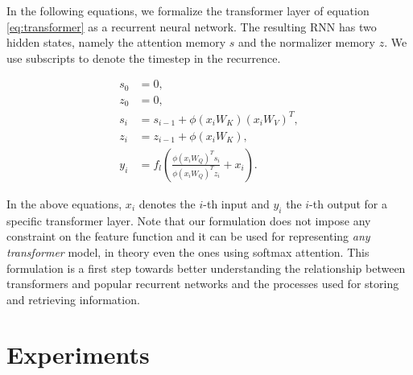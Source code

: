 In the following equations, we formalize the transformer layer of equation
\ref{eq:transformer} as a recurrent neural network. The resulting RNN has two hidden states, namely the attention memory $s$ and the normalizer memory $z$. We use subscripts to denote the timestep in the recurrence.

\begin{align}
    s_0 &= 0 \label{eq:trnn-1}, \\
    z_0 &= 0 \label{eq:trnn-2}, \\
    s_i &= s_{i-1} + \phi\left(x_i W_K\right) \left(x_i W_V\right)^T, \label{eq:trnn-3} \\
    z_i &= z_{i-1} + \phi\left(x_i W_K\right), \label{eq:trnn-4} \\
    y_i &= f_l\left(\frac{\phi\left(x_i W_Q\right)^T s_i}{\phi\left(x_i W_Q\right)^T z_i} + x_i\right).
    \label{eq:trnn-5}
\end{align}

In the above equations, $x_i$ denotes the $i$-th input and $y_i$ the $i$-th output for a specific transformer layer. Note that our formulation does not impose any constraint on the feature function and it can be used for representing \emph{any transformer} model, in theory even the ones using softmax attention. This formulation is a first step towards better understanding the relationship between transformers and popular recurrent networks \cite{hochreiter1997long} and the processes used for storing and retrieving information.

\section{Experiments}

